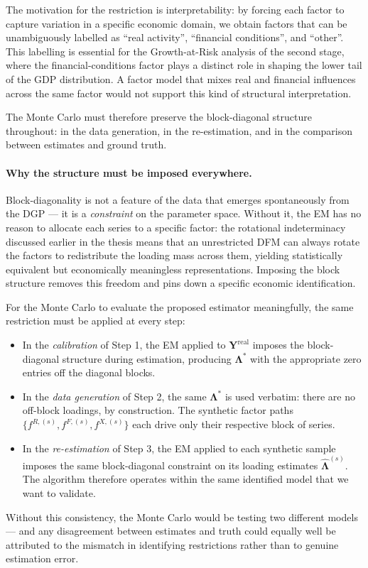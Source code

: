 \documentclass[11pt, a4paper, oneside]{article}
\newcommand{\mY}{\mathbf{Y}}
\newcommand{\mL}{\boldsymbol{\Lambda}}
\begin{document}
The motivation for the restriction is interpretability: by forcing
each factor to capture variation in a specific economic domain,
we obtain factors that can be unambiguously labelled as
``real activity'', ``financial conditions'', and ``other''. This
labelling is essential for the Growth-at-Risk analysis of the
second stage, where the financial-conditions factor plays a
distinct role in shaping the lower tail of the GDP distribution.
A factor model that mixes real and financial influences across
the same factor would not support this kind of structural
interpretation.

The Monte Carlo must therefore preserve the block-diagonal
structure throughout: in the data generation, in the re-estimation,
and in the comparison between estimates and ground truth.

\paragraph{Why the structure must be imposed everywhere.}
Block-diagonality is not a feature of the data that emerges
spontaneously from the DGP — it is a \emph{constraint} on the
parameter space. Without it, the EM has no reason to allocate
each series to a specific factor: the rotational indeterminacy
discussed earlier in the thesis means that an unrestricted DFM
can always rotate the factors to redistribute the loading mass
across them, yielding statistically equivalent but economically
meaningless representations. Imposing the block structure removes
this freedom and pins down a specific economic identification.

For the Monte Carlo to evaluate the proposed estimator
meaningfully, the same restriction must be applied at every step:
\begin{itemize}[leftmargin=1.5em, itemsep=3pt]
    \item In the \emph{calibration} of Step 1, the EM applied to
          $\mY^{\mathrm{real}}$ imposes the block-diagonal
          structure during estimation, producing
          $\mL^*$ with the appropriate zero entries off the
          diagonal blocks.
    \item In the \emph{data generation} of Step 2, the same
          $\mL^*$ is used verbatim: there are no off-block
          loadings, by construction. The synthetic factor paths
          $\{f^{R, (s)}, f^{F, (s)}, f^{X, (s)}\}$ each drive only
          their respective block of series.
    \item In the \emph{re-estimation} of Step 3, the EM applied to
          each synthetic sample imposes the same block-diagonal
          constraint on its loading estimates
          $\hat{\mL}^{(s)}$. The algorithm therefore operates
          within the same identified model that we want to
          validate.
\end{itemize}
Without this consistency, the Monte Carlo would be testing two
different models — and any disagreement between estimates and
truth could equally well be attributed to the mismatch in
identifying restrictions rather than to genuine estimation error.
\end{document}
